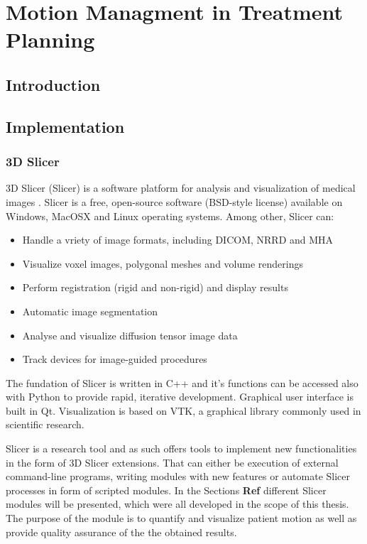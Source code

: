 \documentclass[type=dr, dr=rernat, accentcolor=tud7b,colorbacktitle, bigchapter, openright, twoside, 12pt ]{tudthesis}
\begin{document}
\chapter{Motion Managment in Treatment Planning}
\label{chapter:intro}
\minitoc

\section{Introduction}

\section{Implementation}

\subsection{3D Slicer}

3D Slicer (Slicer) is a software platform for analysis and visualization of medical images \cite{Slicer, Fedorov2012}. Slicer is a free, open-source software (BSD-style license) available on Windows, MacOSX and Linux operating systems. Among other, Slicer can:

\begin{itemize}
	\item Handle a vriety of image formats, including DICOM, NRRD and MHA
	\item Visualize voxel images, polygonal meshes and volume renderings
	\item Perform registration (rigid and non-rigid) and display results
	\item Automatic image segmentation
	\item Analyse and visualize diffusion tensor image data
	\item Track devices for image-guided procedures
\end{itemize}

The fundation of Slicer is written in C++ and it's functions can be accessed also with Python to provide rapid, iterative development. Graphical user interface is built in Qt. Visualization is based on VTK, a graphical library commonly used in scientific research.

Slicer is a research tool and as such offers tools to implement new functionalities in the form of 3D Slicer extensions. That can either be execution of external command-line programs, writing modules with new features or automate Slicer processes in form of scripted modules. 
In the Sections \textbf{Ref} different Slicer modules will be presented, which were all developed in the scope of this thesis. The purpose of the module is to quantify and visualize patient motion as well as provide quality assurance of the the obtained results.
\end{document}
